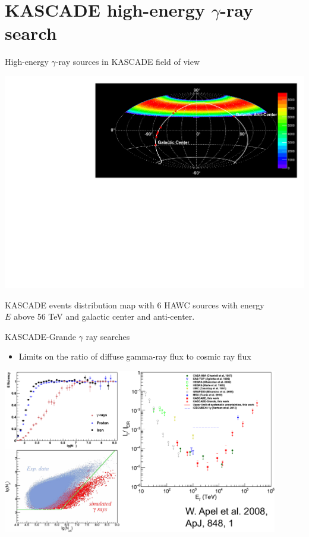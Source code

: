 \section{KASCADE high-energy \texorpdfstring{$\gamma$}{gamma}-ray search}

\begin{frame}{High-energy $\gamma$-ray sources in KASCADE field of view}
  
  \begin{center}
    \includegraphics[width=1\textwidth]{pics/Skymap_6srcs.pdf}
    
 KASCADE events distribution map
  with 6 HAWC sources with energy \\$E$ above 56 TeV and galactic center and anti-center.
\end{center}
\end{frame}

\begin{frame}{KASCADE-Grande $\gamma$ ray searches}
\begin{itemize}
 \item Limits on the ratio of diffuse gamma-ray flux to cosmic ray flux
\end{itemize}

\begin{center}
    \includegraphics[width=0.90\textwidth]{pics/KASCADE-Grande_UHECR2016.pdf}
\end{center}
\end{frame}

